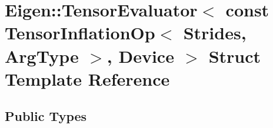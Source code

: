 \hypertarget{struct_eigen_1_1_tensor_evaluator_3_01const_01_tensor_inflation_op_3_01_strides_00_01_arg_type_01_4_00_01_device_01_4}{}\section{Eigen\+:\+:Tensor\+Evaluator$<$ const Tensor\+Inflation\+Op$<$ Strides, Arg\+Type $>$, Device $>$ Struct Template Reference}
\label{struct_eigen_1_1_tensor_evaluator_3_01const_01_tensor_inflation_op_3_01_strides_00_01_arg_type_01_4_00_01_device_01_4}
\subsection*{Public Types}
